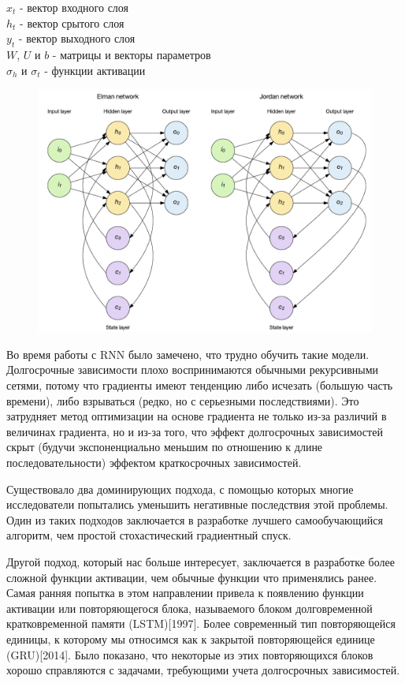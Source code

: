 \documentclass[a4paper,russian]{article}
\begin{document}
	\begin{tabbing}
		$x_t$ - вектор входного слоя \\
		$h_t$ - вектор срытого слоя \\
		$y_t$ - вектор выходного слоя \\
		$W$, $U$ и $b$ - матрицы и векторы параметров \\
		$\sigma_h$ и $\sigma_t$ - функции активации
	\end{tabbing}
	
	\begin{figure}[ht!]
		\centering
		\captionsetup{justification=centering}
		\includegraphics[width=140mm]{img/RNN.png}
	\end{figure}
	
	Во время работы с RNN было замечено, что трудно обучить такие модели. Долгосрочные зависимости плохо воспринимаются обычными рекурсивными сетями, потому что градиенты имеют тенденцию либо исчезать (большую часть времени), либо взрываться (редко, но с серьезными последствиями). Это затрудняет метод оптимизации на основе градиента не только из-за различий в величинах градиента, но и из-за того, что эффект долгосрочных зависимостей скрыт (будучи экспоненциально меньшим по отношению к длине последовательности) эффектом
	краткосрочных зависимостей. 
	
	Существовало два доминирующих подхода, с помощью которых многие исследователи попытались уменьшить негативные последствия этой проблемы. Один из таких подходов заключается в разработке лучшего самообучающийся алгоритм, чем простой стохастический градиентный спуск.
	
	Другой подход, который нас больше интересует, заключается в разработке более сложной функции активации, чем обычные функции что применялись ранее. Самая ранняя попытка в этом направлении привела к появлению функции активации или повторяющегося блока, называемого блоком долговременной кратковременной памяти (LSTM)[1997]. Более современный тип повторяющейся единицы, к которому мы относимся как к закрытой повторяющейся единице (GRU)[2014]. Было показано, что некоторые из этих повторяющихся блоков хорошо справляются с задачами, требующими учета долгосрочных зависимостей.
	
\end{document}

